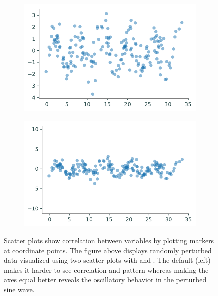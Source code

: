 \begin{figure}[H] %
    \centering
    \begin{subfigure}{.47\textwidth}
        \centering
        \includegraphics[width=\textwidth]{figures/alpha1.pdf}
    \end{subfigure}
    \begin{subfigure}{.47\textwidth}
        \centering
        \includegraphics[width=\textwidth]{figures/alpha2.pdf}
    \end{subfigure}
    \caption{Scatter plots show correlation between variables by plotting markers at coordinate points. The figure above displays randomly perturbed data visualized using two scatter plots with  and . The default (left) makes it harder to see correlation and pattern whereas making the axes equal better reveals the oscillatory behavior in the perturbed sine wave.}
    \label{fig:scatter_scales}
\end{figure}


